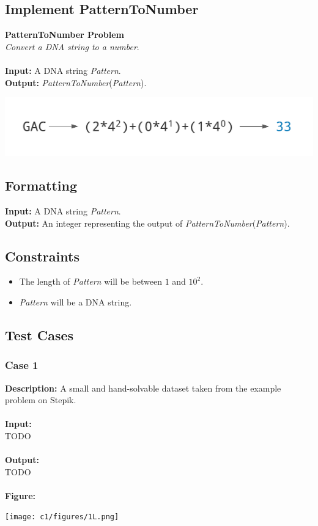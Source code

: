 \documentclass{article}
\begin{document}
\subsection{Implement PatternToNumber}
\hline\vspace{5}
\noindent \textbf{PatternToNumber Problem}\\
\emph{Convert a DNA string to a number}.\\ \\
\textbf{Input:} A DNA string \emph{Pattern}.\\
\textbf{Output:} \emph{PatternToNumber}(\emph{Pattern}).
\begin{center}
    \includegraphics[scale=0.2]{c1/logos/1L.png} 
\end{center}
\hline\vspace{5}

\subsection*{Formatting}
\textbf{Input:} A DNA string \emph{Pattern}.\\
\noindent \textbf{Output:} An integer representing the output of \emph{PatternToNumber}(\emph{Pattern}).

\subsection*{Constraints}
\begin{itemize}
    \item The length of \emph{Pattern} will be between $1$ and $10^2$.
    \item \emph{Pattern} will be a DNA string.
\end{itemize}
\pagebreak
\subsection*{Test Cases}
\subsubsection*{Case 1}
\hline \vspace{5}
\textbf{Description:} A small and hand-solvable dataset taken from the example problem on Stepik.\\ \\
\noindent \textbf{Input:}\\
TODO \\ \\
\noindent \textbf{Output:}\\
TODO \\ \\
\noindent \textbf{Figure:}
\begin{center}
    \texttt{[image: c1/figures/1L.png]}
\end{center}
\end{document}
